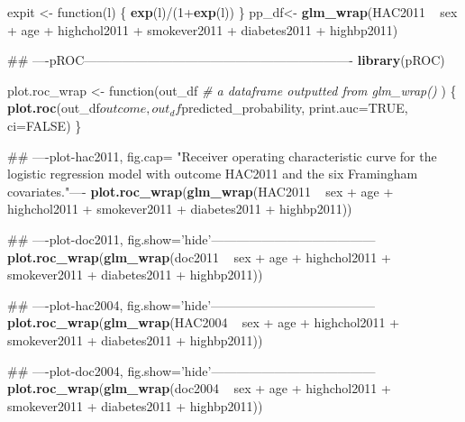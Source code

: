 \documentclass[11pt,]{article}
\newenvironment{Shaded}{\begin{snugshade}}{\end{snugshade}}
\newcommand{\KeywordTok}[1]{\textcolor[rgb]{0.13,0.29,0.53}{\textbf{{#1}}}}
\newcommand{\DataTypeTok}[1]{\textcolor[rgb]{0.13,0.29,0.53}{{#1}}}
\newcommand{\DecValTok}[1]{\textcolor[rgb]{0.00,0.00,0.81}{{#1}}}
\newcommand{\StringTok}[1]{\textcolor[rgb]{0.31,0.60,0.02}{{#1}}}
\newcommand{\CommentTok}[1]{\textcolor[rgb]{0.56,0.35,0.01}{\textit{{#1}}}}
\newcommand{\OtherTok}[1]{\textcolor[rgb]{0.56,0.35,0.01}{{#1}}}
\newcommand{\NormalTok}[1]{{#1}}
\begin{document}
\begin{Shaded}
\begin{Highlighting}[]
     \NormalTok{expit <-}\StringTok{ }\NormalTok{function(l)}
  \NormalTok{\{}
  \KeywordTok{exp}\NormalTok{(l)/(}\DecValTok{1}\NormalTok{+}\KeywordTok{exp}\NormalTok{(l))}
  \NormalTok{\}}
\NormalTok{pp_df<-}\StringTok{ }\KeywordTok{glm_wrap}\NormalTok{(HAC2011 ~}\StringTok{ }\NormalTok{sex +}\StringTok{ }\NormalTok{age +}\StringTok{ }\NormalTok{highchol2011 +}\StringTok{ }\NormalTok{smokever2011 +}\StringTok{ }\NormalTok{diabetes2011 +}\StringTok{ }\NormalTok{highbp2011)}


\NormalTok{## ----pROC----------------------------------------------------------------}
\KeywordTok{library}\NormalTok{(pROC)}

\NormalTok{plot.roc_wrap <-}\StringTok{ }\NormalTok{function(out_df }\CommentTok{# a dataframe outputted from glm_wrap()}
                          \NormalTok{)}
    \NormalTok{\{}
    \KeywordTok{plot.roc}\NormalTok{(out_df$outcome, out_df$predicted_probability, }\DataTypeTok{print.auc=}\OtherTok{TRUE}\NormalTok{, }\DataTypeTok{ci=}\OtherTok{FALSE}\NormalTok{)}
    \NormalTok{\}}



\NormalTok{## ----plot-hac2011, fig.cap= "Receiver operating characteristic curve for the logistic regression model with outcome HAC2011 and the six Framingham covariates."----}
\KeywordTok{plot.roc_wrap}\NormalTok{(}\KeywordTok{glm_wrap}\NormalTok{(HAC2011 ~}\StringTok{ }\NormalTok{sex +}\StringTok{ }\NormalTok{age +}\StringTok{ }\NormalTok{highchol2011 +}\StringTok{ }\NormalTok{smokever2011 +}\StringTok{ }\NormalTok{diabetes2011 +}\StringTok{ }\NormalTok{highbp2011))}


\NormalTok{## ----plot-doc2011, fig.show='hide'---------------------------------------}
\KeywordTok{plot.roc_wrap}\NormalTok{(}\KeywordTok{glm_wrap}\NormalTok{(doc2011 ~}\StringTok{ }\NormalTok{sex +}\StringTok{ }\NormalTok{age +}\StringTok{ }\NormalTok{highchol2011 +}\StringTok{ }\NormalTok{smokever2011 +}\StringTok{ }\NormalTok{diabetes2011 +}\StringTok{ }\NormalTok{highbp2011))}


\NormalTok{## ----plot-hac2004, fig.show='hide'---------------------------------------}
\KeywordTok{plot.roc_wrap}\NormalTok{(}\KeywordTok{glm_wrap}\NormalTok{(HAC2004 ~}\StringTok{ }\NormalTok{sex +}\StringTok{ }\NormalTok{age +}\StringTok{ }\NormalTok{highchol2011 +}\StringTok{ }\NormalTok{smokever2011 +}\StringTok{ }\NormalTok{diabetes2011 +}\StringTok{ }\NormalTok{highbp2011))}


\NormalTok{## ----plot-doc2004, fig.show='hide'---------------------------------------}
\KeywordTok{plot.roc_wrap}\NormalTok{(}\KeywordTok{glm_wrap}\NormalTok{(doc2004 ~}\StringTok{ }\NormalTok{sex +}\StringTok{ }\NormalTok{age +}\StringTok{ }\NormalTok{highchol2011 +}\StringTok{ }\NormalTok{smokever2011 +}\StringTok{ }\NormalTok{diabetes2011 +}\StringTok{ }\NormalTok{highbp2011))}




\end{Highlighting}
\end{Shaded}
\end{document}
